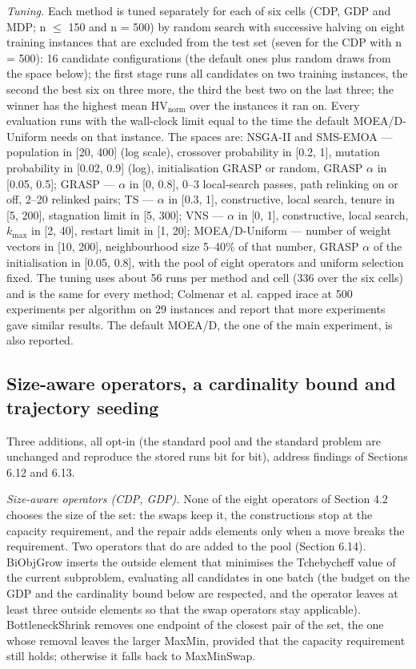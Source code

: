 \emph{Tuning.} Each method is tuned separately for each of six cells (CDP, GDP and MDP; n $\leq$ 150 and n = 500) by random search with successive halving on eight training instances that are excluded from the test set (seven for the CDP with n = 500): 16 candidate configurations (the default ones plus random draws from the space below); the first stage runs all candidates on two training instances, the second the best six on three more, the third the best two on the last three; the winner has the highest mean $\mathrm{HV}_{\mathrm{norm}}$ over the instances it ran on. Every evaluation runs with the wall-clock limit equal to the time the default MOEA/D-Uniform needs on that instance. The spaces are: NSGA-II and SMS-EMOA --- population in [20, 400] (log scale), crossover probability in [0.2, 1], mutation probability in [0.02, 0.9] (log), initialisation GRASP or random, GRASP $\alpha$ in [0.05, 0.5]; GRASP --- $\alpha$ in [0, 0.8], 0--3 local-search passes, path relinking on or off, 2--20 relinked pairs; TS --- $\alpha$ in [0.3, 1], constructive, local search, tenure in [5, 200], stagnation limit in [5, 300]; VNS --- $\alpha$ in [0, 1], constructive, local search, $k_{\mathrm{max}}$ in [2, 40], restart limit in [1, 20]; MOEA/D-Uniform --- number of weight vectors in [10, 200], neighbourhood size 5--40\% of that number, GRASP $\alpha$ of the initialisation in [0.05, 0.8], with the pool of eight operators and uniform selection fixed. The tuning uses about 56 runs per method and cell (336 over the six cells) and is the same for every method; Colmenar et al. capped irace at 500 experiments per algorithm on 29 instances and report that more experiments gave similar results. The default MOEA/D, the one of the main experiment, is also reported.

\subsection{Size-aware operators, a cardinality bound and trajectory seeding}\label{sec:size_aware_operators_a_cardi}

Three additions, all opt-in (the standard pool and the standard problem are unchanged and reproduce the stored runs bit for bit), address findings of Sections 6.12 and 6.13.

\emph{Size-aware operators (CDP, GDP).} None of the eight operators of Section 4.2 chooses the size of the set: the swaps keep it, the constructions stop at the capacity requirement, and the repair adds elements only when a move breaks the requirement. Two operators that do are added to the pool (Section 6.14). BiObjGrow inserts the outside element that minimises the Tchebycheff value of the current subproblem, evaluating all candidates in one batch (the budget on the GDP and the cardinality bound below are respected, and the operator leaves at least three outside elements so that the swap operators stay applicable). BottleneckShrink removes one endpoint of the closest pair of the set, the one whose removal leaves the larger MaxMin, provided that the capacity requirement still holds; otherwise it falls back to MaxMinSwap.

